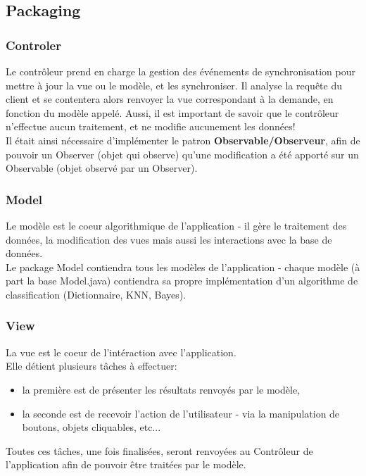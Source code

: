 \documentclass[pdftex,12pt,a4paper]{report}
\begin{document}
\begin{spacing}{1.2}
\subsection{Packaging}

\subsubsection{Controler}

Le contrôleur prend en charge la gestion des événements de synchronisation pour mettre à jour la vue ou le modèle, et les synchroniser. Il analyse la requête du client et se contentera alors renvoyer la vue correspondant à la demande, en fonction du modèle appelé. Aussi, il est important de savoir que le contrôleur n'effectue aucun traitement, et ne modifie aucunement les données!
\\
Il était ainsi nécessaire d'implémenter le patron \textbf{Observable/Observeur}, afin de pouvoir un Observer (objet qui observe) qu'une modification a été apporté sur un Observable (objet observé par un Observer).

\subsubsection{Model}

Le modèle est le coeur algorithmique de l'application - il gère le traitement des données, la modification des vues mais aussi les interactions avec la base de données.
\\
Le package Model contiendra tous les modèles de l'application - chaque modèle (à part la base Model.java) contiendra sa propre implémentation d'un algorithme de classification (Dictionnaire, KNN, Bayes).

\subsubsection{View}

La vue est le coeur de l'intéraction avec l'application.
\\
Elle détient plusieurs tâches à effectuer:
\begin{itemize}
\item{la première est de présenter les résultats renvoyés par le modèle,}
\item{la seconde est de recevoir l'action de l'utilisateur - via la manipulation de boutons, objets cliquables, etc...}
\end{itemize}
Toutes ces tâches, une fois finalisées, seront renvoyées au Contrôleur de l'application afin de pouvoir être traitées par le modèle.


\end{spacing}
\end{document}
